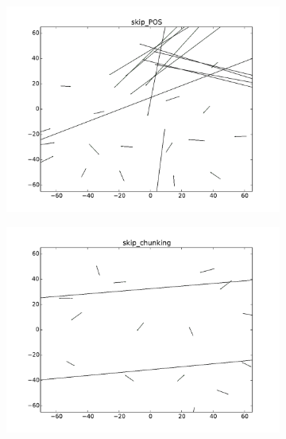 \begin{figure}
\caption{Updated vs. no-updated word representations for POS-tagging and chunking using skip-gram}
\centering
\begin{subfigure}[b]{0.48\textwidth}
	\centering
    \includegraphics[width=\textwidth]{plots/vectorField/Lizhen/scaled/skip_POS}    	
	\label{fig:skippos}
\end{subfigure}
\begin{subfigure}[b]{0.48\textwidth}
	\centering
    \includegraphics[width=\textwidth]{plots/vectorField/Lizhen/scaled/skip_chunking}
	\label{fig:skipChu}
\end{subfigure}
\label{fig:vectorfield}
\end{figure}

